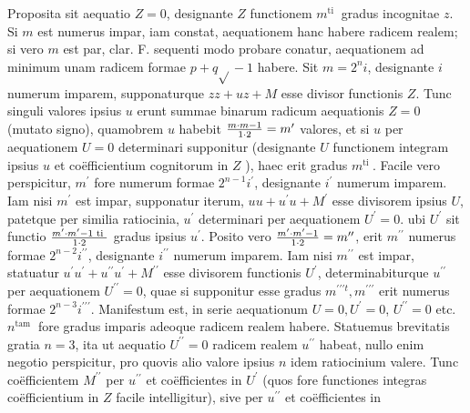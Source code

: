 \documentclass[twoside,12pt, showframe]{memoir}
\let\oldfrac\frac
\def\frac#1#2{\mathchoice{\tfrac{#1}{#2}}{\oldfrac{#1}{#2}}{\genfrac{}{}{}{2}{#1}{#2\mathstrut}}{\genfrac{}{}{}{3}{#1}{#2\mathstrut}}}
\begin{document}
Proposita sit aequatio \(Z=0\), designante \(Z\) functionem \(m^{\text {ti }}\) gradus incognitae \(z\). Si \(m\) est numerus impar, iam constat, aequationem hanc habere radicem realem; si vero \(m\) est par, clar. F. sequenti modo probare conatur, aequationem ad minimum unam radicem formae \(p+q \sqrt{ }-1\) habere. Sit \(m=2^{n} i\), designante \(i\) numerum imparem, supponaturque \(z z+u z+M\) esse divisor functionis \(Z\). Tunc singuli valores ipsius \(u\) erunt summae binarum radicum aequationis \(Z=0\) (mutato signo), quamobrem \(u\) habebit \(\frac{m \cdot m-1}{1 \cdot 2}=m^{\prime}\) valores, et si \(u\) per aequationem \(U=0\) determinari supponitur (designante \(U\) functionem integram ipsius \(u\) et coëfficientium cognitorum in \(Z\) ), haec erit gradus \(m^{\text {ti }}\). Facile vero perspicitur, \(m^{\prime}\) fore numerum formae \(2^{n-1} i^{\prime}\), designante \(i^{\prime}\) numerum imparem. Iam nisi \(m^{\prime}\) est impar, supponatur iterum, \(u u+u^{\prime} u+M^{\prime}\) esse divisorem ipsius \(U\), patetque per similia ratiocinia, \(u^{\prime}\) determinari per aequationem \(U^{\prime}=0\). ubi \(U^{\prime}\) sit functio \(\frac{m^{\prime} \cdot m^{\prime}-1 \text { ti }}{1 \cdot 2}\) gradus ipsius \(u^{\prime}\). Posito vero \(\frac{m^{\prime} \cdot m^{\prime}-1}{1 \cdot 2}=m^{\prime \prime}\), erit \(m^{\prime \prime}\) numerus formae \(2^{n-2} i^{\prime \prime}\), designante \(i^{\prime \prime}\) numerum imparem. Iam nisi \(m^{\prime \prime}\) est impar, statuatur \(u^{\prime} u^{\prime}+u^{\prime \prime} u^{\prime}+M^{\prime \prime}\) esse divisorem functionis \(U^{\prime}\), determinabiturque \(u^{\prime \prime}\) per aequationem \(U^{\prime \prime}=0\), quae si supponitur esse gradus \(m^{\prime \prime \prime t}, m^{\prime \prime \prime}\) erit numerus formae \(2^{n-3} i^{\prime \prime \prime}\). Manifestum est, in serie aequationum \(U=0, U^{\prime}=0\), \(U^{\prime \prime}=0\) etc. \(n^{\text {tam }}\) fore gradus imparis adeoque radicem realem habere. Statuemus brevitatis gratia \(n=3\), ita ut aequatio \(U^{\prime \prime}=0\) radicem realem \(u^{\prime \prime}\) habeat, nullo enim negotio perspicitur, pro quovis alio valore ipsius \(n\) idem ratiocinium valere. Tunc coëfficientem \(M^{\prime \prime}\) per \(u^{\prime \prime}\) et coëfficientes in \(U^{\prime}\) (quos fore functiones integras coëfficientium in \(Z\) facile intelligitur), sive per \(u^{\prime \prime}\) et coëfficientes in
\end{document}
